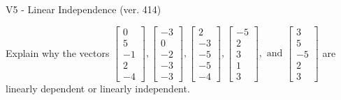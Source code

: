 \begin{exercise}
  \begin{exerciseTitle}V5 - Linear Independence (ver. 414)\end{exerciseTitle}
  \begin{exerciseStatement}
    Explain why the vectors \(\left[\begin{array}{r}
0 \\
5 \\
-1 \\
2 \\
-4
\end{array}\right] , \left[\begin{array}{r}
-3 \\
0 \\
-2 \\
-3 \\
-3
\end{array}\right] , \left[\begin{array}{r}
2 \\
-3 \\
-5 \\
-5 \\
-4
\end{array}\right] , \left[\begin{array}{r}
-5 \\
2 \\
3 \\
1 \\
3
\end{array}\right] , \text{ and } \left[\begin{array}{r}
3 \\
5 \\
-5 \\
2 \\
3
\end{array}\right]\) are linearly dependent or linearly independent.	



\end{exerciseStatement}
\end{exercise}
